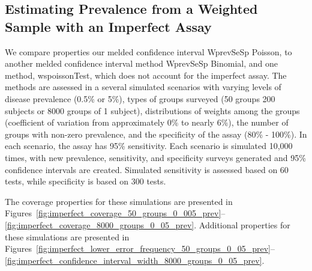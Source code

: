 \documentclass[AMA,STIX1COL]{WileyNJD-v2}
\begin{document}
\subsection{Estimating Prevalence from a Weighted Sample with an Imperfect Assay}


We compare properties our melded confidence interval WprevSeSp Poisson, to another melded confidence interval method WprevSeSp Binomial, and one method, wspoissonTest, which does not account for the imperfect assay.
The methods are assessed in a several simulated scenarios with varying levels of disease prevalence (0.5\% or 5\%), types of groups surveyed (50 groups 200 subjects or 8000 groups of 1 subject), distributions of weights among the groups (coefficient of variation from approximately 0\% to nearly 6\%), the number of groups with non-zero prevalence, and the specificity of the assay (80\% - 100\%).
In each scenario, the assay has 95\% sensitivity.
Each scenario is simulated 10,000 times, with new prevalence, sensitivity, and specificity surveys generated and 95\% confidence intervals are created.
Simulated sensitivity is assessed based on 60 tests, while specificity is based on 300 tests.


The coverage properties for these simulations are presented in Figures~\ref{fig:imperfect_coverage_50_groups_0_005_prev}--\ref{fig:imperfect_coverage_8000_groups_0_05_prev}.
Additional properties for these simulations are presented in Figures~\ref{fig:imperfect_lower_error_frequency_50_groups_0_05_prev}--\ref{fig:imperfect_confidence_interval_width_8000_groups_0_05_prev}.
\end{document}
